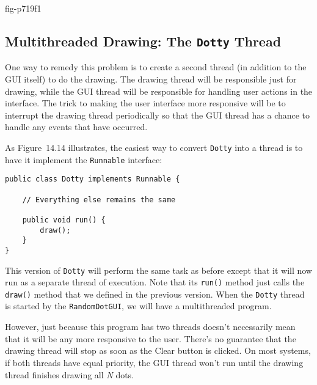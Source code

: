 {fig-p719f1}

\subsection{Multithreaded Drawing: The {\tt Dotty} Thread}
\noindent One way to remedy this problem is to create a second thread (in
addition to the GUI itself) to do the drawing.  The drawing thread
will be responsible just for drawing, while the GUI thread will be
responsible for handling user actions in the interface.   The trick to
making the user interface more responsive will be to interrupt the
drawing thread periodically so that the GUI thread has a chance to
handle any events that have occurred.

As Figure~14.14 illustrates, the easiest way to convert
{\tt Dotty} into a thread is to have it implement the {\tt Runnable}
interface:

\begin{jjjlisting}
\begin{lstlisting}
public class Dotty implements Runnable {

    // Everything else remains the same

    public void run() {
        draw();
    }
}
\end{lstlisting}
\end{jjjlisting}

\noindent This version of {\tt Dotty} will perform the same task as before
except that it will now run as a separate thread of execution.  Note
that its {\tt run()} method just calls the {\tt draw()} method that we
defined in the previous version.   When the {\tt Dotty} thread is
started by the {\tt RandomDotGUI}, we will have a multithreaded
program.

However, just because this program has two threads doesn't
necessarily mean that it will be any more responsive to the user.
There's no guarantee that the drawing thread will stop as soon as the
Clear button is clicked.  On most systems, if both threads have
equal priority, the GUI thread won't run until the drawing thread
finishes drawing all {\it N} dots.



